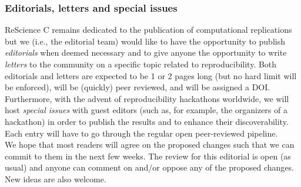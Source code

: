 \subsubsection{Editorials, letters and special issues}

ReScience C remains dedicated to the publication of computational replications
but we (i.e., the editorial team) would like to have the opportunity to
publish \emph{editorials} when deemed necessary and to give anyone the
opportunity to write \emph{letters} to the community on a specific topic
related to reproducibility. Both editorials and letters are expected to be 1 or
2 pages long (but no hard limit will be enforced), will be (quickly) peer reviewed,
and will be assigned a DOI. Furthermore, with the advent of reproducibility
hackathons worldwide, we will host {\em special issues} with guest editors (such
as, for example, the organizers of a hackathon) in order to publish the results
and to enhance their discoverability. Each entry will have to go through the
regular open peer-reviewed pipeline.\\


We hope that most readers will agree on the proposed changes such that we can
commit to them in the next few weeks. The review for this editorial is open (as
usual) and anyone can comment on and/or oppose any of the proposed changes. New
ideas are also welcome.
